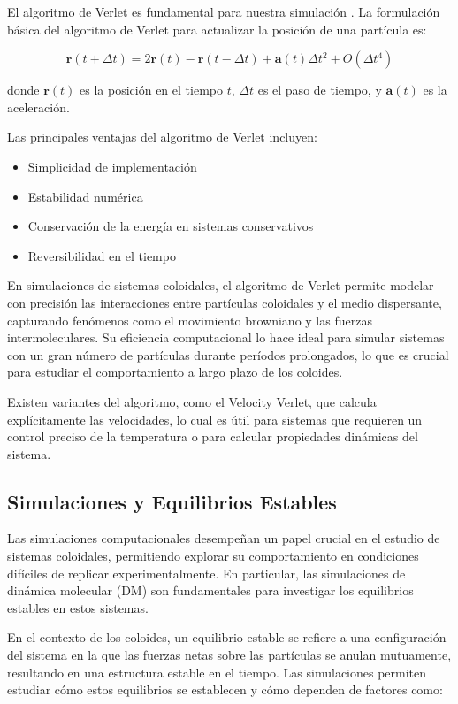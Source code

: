 \documentclass[twocolumn]{article}
\begin{document}
El algoritmo de Verlet es fundamental para nuestra simulación \cite{verlet_wiki}.
La formulación básica del algoritmo de Verlet para actualizar la posición de una partícula es:

\begin{equation}
    \mathbf{r}(t + \Delta t) = 2\mathbf{r}(t) - \mathbf{r}(t - \Delta t) + \mathbf{a}(t)\Delta t^2 + O(\Delta t^4)
\end{equation}

donde $\mathbf{r}(t)$ es la posición en el tiempo $t$, $\Delta t$ es el paso de tiempo, y $\mathbf{a}(t)$ es la aceleración.

Las principales ventajas del algoritmo de Verlet incluyen:

\begin{itemize}
    \item Simplicidad de implementación
    \item Estabilidad numérica
    \item Conservación de la energía en sistemas conservativos
    \item Reversibilidad en el tiempo
\end{itemize}

En simulaciones de sistemas coloidales, el algoritmo de Verlet permite modelar con precisión las interacciones entre partículas coloidales y el medio dispersante, capturando fenómenos como el movimiento browniano y las fuerzas intermoleculares. Su eficiencia computacional lo hace ideal para simular sistemas con un gran número de partículas durante períodos prolongados, lo que es crucial para estudiar el comportamiento a largo plazo de los coloides.

Existen variantes del algoritmo, como el Velocity Verlet, que calcula explícitamente las velocidades, lo cual es útil para sistemas que requieren un control preciso de la temperatura o para calcular propiedades dinámicas del sistema.

\subsection*{Simulaciones y Equilibrios Estables}
Las simulaciones computacionales desempeñan un papel crucial en el estudio de sistemas coloidales, permitiendo explorar su comportamiento en condiciones difíciles de replicar experimentalmente. En particular, las simulaciones de dinámica molecular (DM) son fundamentales para investigar los equilibrios estables en estos sistemas.

En el contexto de los coloides, un equilibrio estable se refiere a una configuración del sistema en la que las fuerzas netas sobre las partículas se anulan mutuamente, resultando en una estructura estable en el tiempo. Las simulaciones permiten estudiar cómo estos equilibrios se establecen y cómo dependen de factores como:
\end{document}
